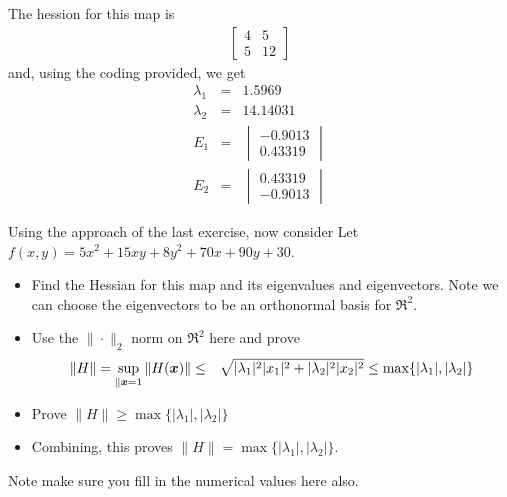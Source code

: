 \documentclass[11pt]{SelfArxOneColBMN}
\begin{document}
\begin{solution}
  The hession for this map is
  \begin{eqnarray*}
    \begin{bmatrix}
      4 & 5\\
      5 & 12
    \end{bmatrix}
  \end{eqnarray*}
  and, using the coding provided, we get
  \begin{eqnarray*}
    \lambda_1 &=& 1.5969\\
    \lambda_2 &=& 14.14031\\
    E_1 &=&
    \begin{vmatrix}
      -0.9013\\
      0.43319
    \end{vmatrix}
    \\
    E_2 &=&
    \begin{vmatrix}
      0.43319\\
      -0.9013
    \end{vmatrix} 
  \end{eqnarray*}
\end{solution}

\begin{exercise}
Using the approach of the last exercise, now consider
Let $f(x,y) = 5x^2 + 15xy + 8y^2 + 70x + 90y + 30$.
\begin{itemize}
\item Find the Hessian for this map and its eigenvalues and eigenvectors.
Note we can choose the eigenvectors to be an orthonormal basis for $\Re^2$.
\item Use the $\| \cdot\|_2$ norm on $\Re^2$ here and prove
\begin{eqnarray*}
\|H\| = \sup_{\|\boldsymbol{x} = 1} \|H(\boldsymbol{x})\| & \leq & \sqrt{|\lambda_1|^2 |x_1|^2 + |\lambda_2|^2 |x_2|^2}
\leq \max\{ |\lambda_1|,|\lambda_2|\}
\end{eqnarray*}
\item Prove $\|H\|  \geq \max\{ |\lambda_1|,|\lambda_2|\}$
\item Combining, this proves $\|H\|  = \max\{ |\lambda_1|,|\lambda_2|\}$.
\end{itemize}
\noindent
Note make sure you fill in the numerical values here also.
\end{exercise}
\end{document}
